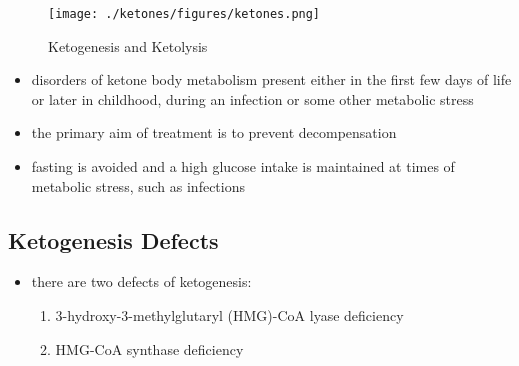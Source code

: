 \documentclass{scrartcl}
\begin{document}
\begin{figure}[htbp]
\centering
\texttt{[image: ./ketones/figures/ketones.png]}
\caption{\label{fig:orgf914533}
Ketogenesis and Ketolysis}
\end{figure}

\begin{itemize}
\item disorders of ketone body metabolism present either in the first few
days of life or later in childhood, during an infection or some
other metabolic stress
\item the primary aim of treatment is to prevent decompensation
\item fasting is avoided and a high glucose intake is maintained at times
of metabolic stress, such as infections
\end{itemize}

\subsection{Ketogenesis Defects}
\label{sec:orgb2a2c39}
\begin{itemize}
\item there are two defects of ketogenesis:
\begin{enumerate}
\item 3-hydroxy-3-methylglutaryl (HMG)-CoA lyase deficiency
\item HMG-CoA synthase deficiency
\end{enumerate}
\end{itemize}
\end{document}
